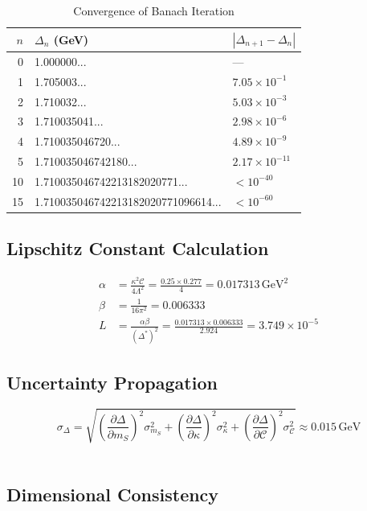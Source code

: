 \documentclass[11pt,a4paper]{article}
\theoremstyle{plain}
\theoremstyle{definition}
\begin{document}
\begin{table}[htbp]
\centering
\caption{Convergence of Banach Iteration}
\begin{tabular}{@{}rll@{}}
\toprule
$n$ & $\Delta_n$ (GeV) & $|\Delta_{n+1} - \Delta_n|$ \\
\midrule
0 & 1.000000... & --- \\
1 & 1.705003... & $7.05 \times 10^{-1}$ \\
2 & 1.710032... & $5.03 \times 10^{-3}$ \\
3 & 1.710035041... & $2.98 \times 10^{-6}$ \\
4 & 1.710035046720... & $4.89 \times 10^{-9}$ \\
5 & 1.710035046742180... & $2.17 \times 10^{-11}$ \\
10 & 1.710035046742213182020771... & $< 10^{-40}$ \\
15 & 1.710035046742213182020771096614... & $< 10^{-60}$ \\
\bottomrule
\end{tabular}
\end{table}
\newpage
\subsection{Lipschitz Constant Calculation}

\begin{align}
\alpha &= \frac{\kappa^2\mathcal{C}}{4\Lambda^2} = \frac{0.25 \times 0.277}{4} = 0.017313\,\mathrm{GeV}^2 \\
\beta &= \frac{1}{16\pi^2} = 0.006333 \\
L &= \frac{\alpha\beta}{(\Delta^*)^2} = \frac{0.017313 \times 0.006333}{2.924} = 3.749 \times 10^{-5}
\end{align}

\subsection{Uncertainty Propagation}
\vspace{0.3em}
\begin{equation}
\sigma_\Delta = \sqrt{\left(\frac{\partial\Delta}{\partial m_S}\right)^2\sigma_{m_S}^2
+ \left(\frac{\partial\Delta}{\partial\kappa}\right)^2\sigma_\kappa^2
+ \left(\frac{\partial\Delta}{\partial\mathcal{C}}\right)^2\sigma_\mathcal{C}^2}
\approx 0.015\,\mathrm{GeV}
\end{equation}
\vspace{0.3em}\\
\subsection{Dimensional Consistency}
\end{document}
